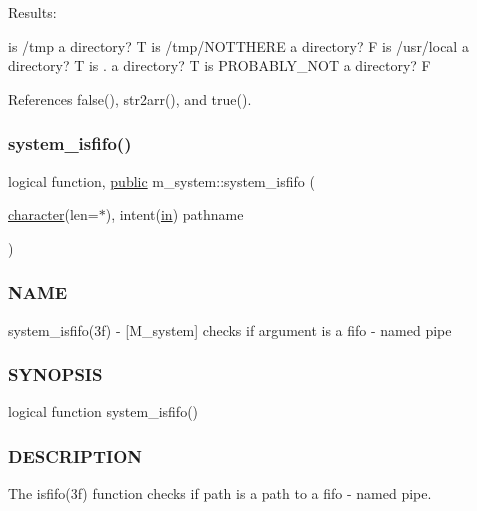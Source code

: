 Results\+:

is /tmp a directory? T is /tmp/\+N\+O\+T\+T\+H\+E\+RE a directory? F is /usr/local a directory? T is . a directory? T is P\+R\+O\+B\+A\+B\+L\+Y\+\_\+\+N\+OT a directory? F 

References false(), str2arr(), and true().

\mbox{\label{namespacem__system_acbcaa0c5075ca103815f441ee410e1a3}} 
\subsubsection{\texorpdfstring{system\+\_\+isfifo()}{system\_isfifo()}}
{\footnotesize\ttfamily logical function, \hyperlink{M__stopwatch_83_8txt_a2f74811300c361e53b430611a7d1769f}{public} m\+\_\+system\+::system\+\_\+isfifo (\begin{DoxyParamCaption}\item[{\hyperlink{option__stopwatch_83_8txt_abd4b21fbbd175834027b5224bfe97e66}{character}(len=$\ast$), intent(\hyperlink{M__journal_83_8txt_afce72651d1eed785a2132bee863b2f38}{in})}]{pathname }\end{DoxyParamCaption})}



\subsubsection*{N\+A\+ME}

system\+\_\+isfifo(3f) -\/ \mbox{[}M\+\_\+system\mbox{]} checks if argument is a fifo -\/ named pipe 

\subsubsection*{S\+Y\+N\+O\+P\+S\+IS}

\begin{DoxyVerb}logical function system_isfifo()
\end{DoxyVerb}


\subsubsection*{D\+E\+S\+C\+R\+I\+P\+T\+I\+ON}

The isfifo(3f) function checks if path is a path to a fifo -\/ named pipe.

